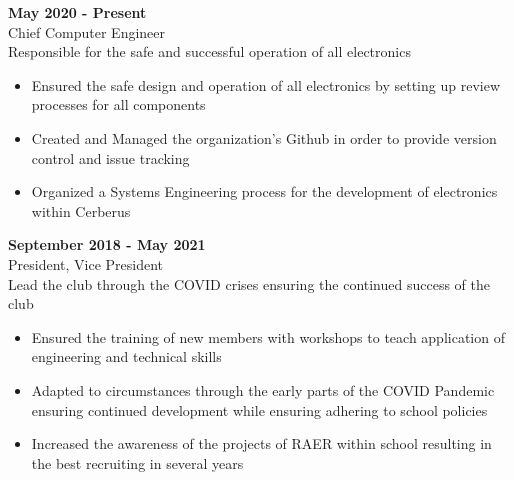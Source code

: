 \documentclass[10pt]{article}
\newcommand{\entrySpacing}{4pt}
\begin{document}
\noindent\begin{minipage}{\linewidth}
 \hfill \textbf{May 2020 - Present}\\
Chief Computer Engineer\hfill \\Responsible for the safe and successful operation of all electronics
\begin{itemize}[noitemsep,nolistsep]
\item Ensured the safe design and operation of all electronics by setting up review processes for all components
\item Created and Managed the organization's Github in order to provide version control and issue tracking
\item Organized a Systems Engineering process for the development of electronics within Cerberus
\end{itemize}


\end{minipage}
\vspace{\entrySpacing}

\noindent\begin{minipage}{\linewidth}
 \hfill \textbf{September 2018 - May 2021}\\
President, Vice President\hfill \\Lead the club through the COVID crises ensuring the continued success of the club
\begin{itemize}[noitemsep,nolistsep]
\item Ensured the training of new members with workshops to teach application of engineering and technical skills
\item Adapted to circumstances through the early parts of the COVID  Pandemic ensuring continued development while ensuring adhering to school policies
\item Increased the awareness of the projects of RAER within school resulting in the best recruiting in several years
\end{itemize}


\end{minipage}
\vspace{\entrySpacing}
\end{document}
